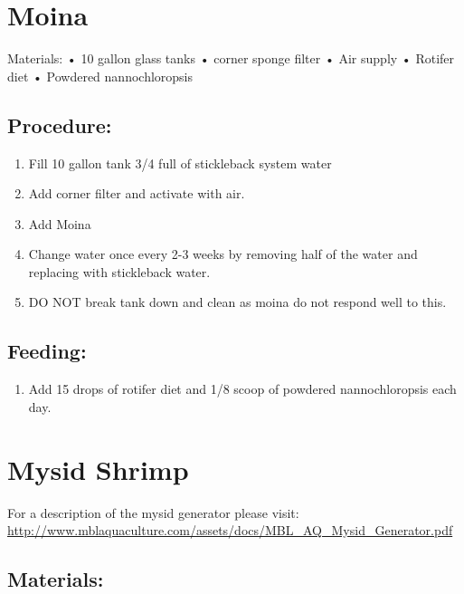 \documentclass[
]{book}
\providecommand{\tightlist}{%
  \setlength{\itemsep}{0pt}\setlength{\parskip}{0pt}}
\begin{document}
\hypertarget{moina}{%
\section{Moina}\label{moina}}

Materials:
• 10 gallon glass tanks
• corner sponge filter
• Air supply
• Rotifer diet
• Powdered nannochloropsis

\hypertarget{procedure-6}{%
\subsection{Procedure:}\label{procedure-6}}

\begin{enumerate}
\def\labelenumi{\arabic{enumi}.}
\tightlist
\item
  Fill 10 gallon tank 3/4 full of stickleback system water
\item
  Add corner filter and activate with air.
\item
  Add Moina
\item
  Change water once every 2-3 weeks by removing half of the water and replacing with stickleback water.
\item
  DO NOT break tank down and clean as moina do not respond well to this.
\end{enumerate}

\hypertarget{feeding}{%
\subsection{\texorpdfstring{\textbf{Feeding}:}{Feeding:}}\label{feeding}}

\begin{enumerate}
\def\labelenumi{\arabic{enumi}.}
\setcounter{enumi}{5}
\tightlist
\item
  Add 15 drops of rotifer diet and 1/8 scoop of powdered nannochloropsis each day.
\end{enumerate}

\hypertarget{mysid-shrimp}{%
\section{Mysid Shrimp}\label{mysid-shrimp}}

For a description of the mysid generator please visit:
\url{http://www.mblaquaculture.com/assets/docs/MBL_AQ_Mysid_Generator.pdf}

\hypertarget{materials-3}{%
\subsection{Materials:}\label{materials-3}}
\end{document}
